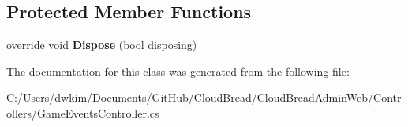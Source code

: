 \subsection*{Protected Member Functions}
\begin{DoxyCompactItemize}
\item 
override void {\bfseries Dispose} (bool disposing)\hypertarget{class_cloud_bread_admin_web_1_1_controllers_1_1_game_events_controller_a682b5d4169ab1b930a51b78f156a5ee5}{}\label{class_cloud_bread_admin_web_1_1_controllers_1_1_game_events_controller_a682b5d4169ab1b930a51b78f156a5ee5}

\end{DoxyCompactItemize}


The documentation for this class was generated from the following file\+:\begin{DoxyCompactItemize}
\item 
C\+:/\+Users/dwkim/\+Documents/\+Git\+Hub/\+Cloud\+Bread/\+Cloud\+Bread\+Admin\+Web/\+Controllers/Game\+Events\+Controller.\+cs\end{DoxyCompactItemize}
